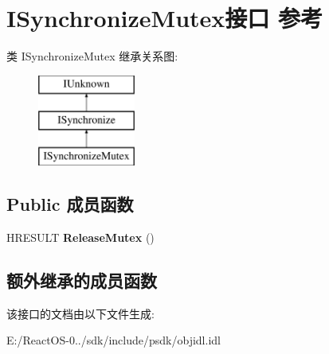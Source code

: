 \hypertarget{interface_i_synchronize_mutex}{}\section{I\+Synchronize\+Mutex接口 参考}
\label{interface_i_synchronize_mutex}
类 I\+Synchronize\+Mutex 继承关系图\+:\begin{figure}[H]
\begin{center}
\leavevmode
\includegraphics[height=3.000000cm]{interface_i_synchronize_mutex}
\end{center}
\end{figure}
\subsection*{Public 成员函数}
\begin{DoxyCompactItemize}
\item 
\mbox{\label{interface_i_synchronize_mutex_a90a44cd33c1bcbd65edca1724644b500}} 
H\+R\+E\+S\+U\+LT {\bfseries Release\+Mutex} ()
\end{DoxyCompactItemize}
\subsection*{额外继承的成员函数}


该接口的文档由以下文件生成\+:\begin{DoxyCompactItemize}
\item 
E\+:/\+React\+O\+S-\/0../sdk/include/psdk/objidl.\+idl\end{DoxyCompactItemize}
